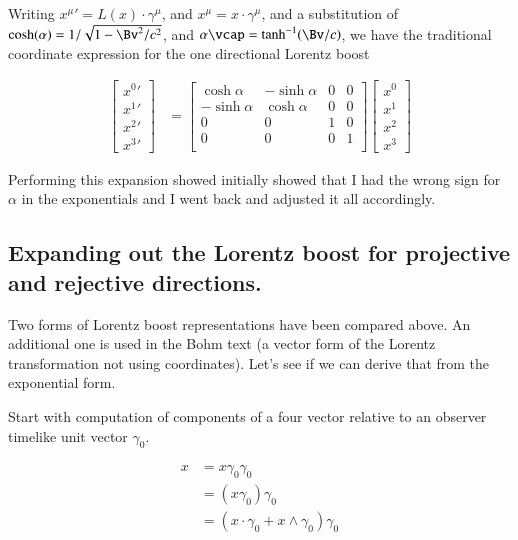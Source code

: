 \documentclass{article}
\begin{document}
Writing ${x^\mu}' = L(x) \cdot \gamma^\mu$, and $x^\mu = x \cdot \gamma^\mu$,
and a substitution of $\cosh(\alpha) = 1/\sqrt{1 - \Bv^2/c^2}$, and $\alpha \vcap = \tanh^{-1}(\Bv/c)$,
we have the traditional coordinate
expression for the one directional Lorentz boost

\begin{align}
\begin{bmatrix}
{x^0}' \\
{x^1}' \\
{x^2}' \\
{x^3}'
\end{bmatrix}
&=
\begin{bmatrix}
\cosh\alpha & -\sinh\alpha & 0 & 0 \\
-\sinh\alpha & \cosh\alpha & 0 & 0 \\
0 & 0 & 1 & 0 \\
0 & 0 & 0 & 1 \\
\end{bmatrix}
\begin{bmatrix}
x^0 \\
x^1 \\
x^2 \\
x^3
\end{bmatrix}
\end{align}

Performing this expansion showed initially showed that I had the wrong sign for $\alpha$ in the exponentials and I went back and
adjusted it all accordingly.

\subsection{ Expanding out the Lorentz boost for projective and rejective directions. }

Two forms of Lorentz boost representations have been compared above.  An additional one is used in the Bohm text (a 
vector form of the Lorentz transformation not using coordinates).  Let's see
if we can derive that from the exponential form.

Start with computation of components of a four vector relative to an observer timelike unit vector $\gamma_0$.

\begin{align*}
x 
&= x \gamma_0 \gamma_0 \\
&= (x \gamma_0) \gamma_0 \\
&= (x \cdot \gamma_0 + x \wedge \gamma_0) \gamma_0 \\
\end{align*}
\end{document}
